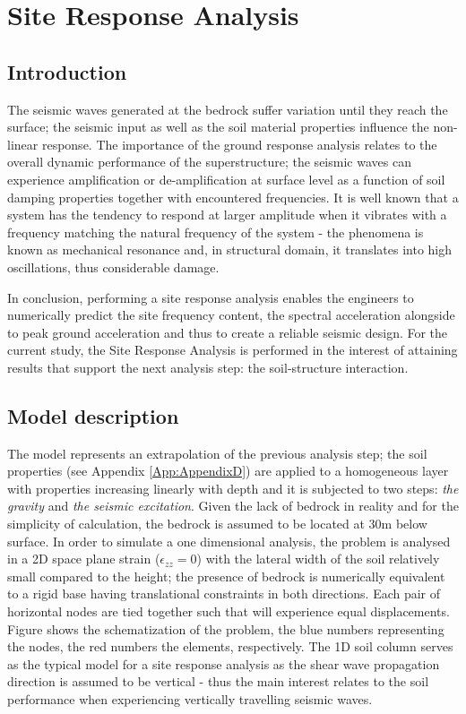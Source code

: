 	\chapter {Site Response Analysis}
	\section{Introduction}
	The seismic waves generated at the bedrock suffer variation until they reach the surface; the seismic input as well as the soil material properties influence the non-linear response. The importance of the ground response analysis relates to the overall dynamic performance of the superstructure; the seismic waves can experience amplification or de-amplification at surface level as a function of soil damping properties together with encountered frequencies. It is well known that a system has the tendency to respond at larger amplitude when it vibrates with a frequency matching the natural frequency of the system - the phenomena is known as mechanical resonance and, in structural domain, it translates into high oscillations, thus considerable damage.
	
	In conclusion, performing a site response analysis enables the engineers to numerically predict the site frequency content, the spectral acceleration alongside to peak ground acceleration and thus to create a reliable seismic design. For the current study, the Site Response Analysis is performed in the interest of attaining results that support the next analysis step: the soil-structure interaction.
	
	
	\section{Model description}
	The model represents an extrapolation of the previous analysis step; the soil properties (see Appendix \ref{App:AppendixD}) are applied to a homogeneous layer with properties increasing linearly with depth and it is subjected to two steps: \textit{the gravity} and \textit{the seismic excitation}. Given the lack of bedrock in reality and for the simplicity of calculation, the bedrock is assumed to be located at 30m below surface. In order to simulate a one dimensional analysis, the problem is analysed in a 2D space plane strain ($\epsilon_{zz}=0$) with the lateral width of the soil relatively small compared to the height; the presence of bedrock is numerically equivalent to a rigid base having translational constraints in both directions. Each pair of horizontal nodes are tied together such that will experience equal displacements. Figure \label{fig:Soilcolumn} shows the schematization of the problem, the blue numbers representing the nodes, the red numbers the elements, respectively. The 1D soil column serves as the typical model for a site response analysis as the shear wave propagation direction is assumed to be vertical - thus the main interest relates to the soil performance when experiencing vertically travelling seismic waves.
	
